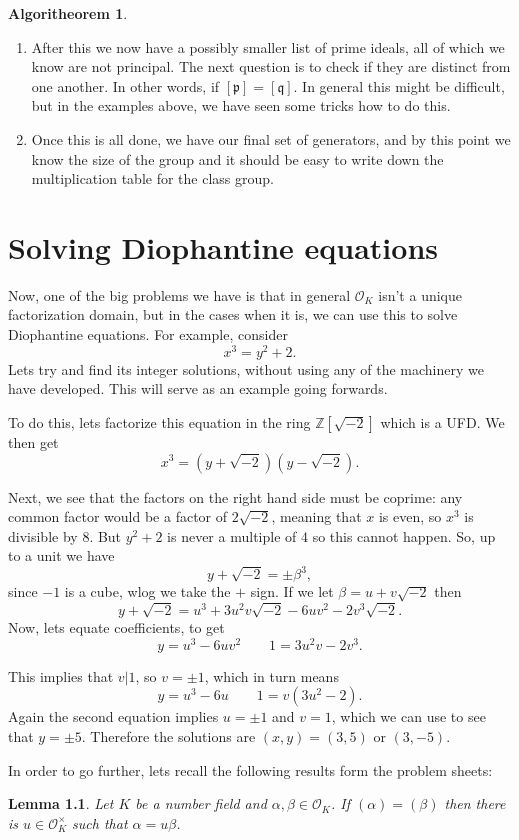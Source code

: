 \documentclass[11pt,a4paper]{report}
\theoremstyle{plain}
\newtheorem{lemma}[subsection]{Lemma}
\theoremstyle{definition}
\theoremstyle{definition}
\newtheorem{alg}[subsection]{Algoritheorem}
\newcommand{\ZZ}{\mathbb{Z}}
\def\gothp{\mathfrak{p}}
\def\gothq{\mathfrak{q}}
\def \a{\alpha}
\def \OO {\mathcal{O}}
\begin{document}
\begin{alg}
\begin{enumerate}
			\item After this we now have a possibly smaller list of prime ideals, all of which we know are not principal. The next question is to check if they are distinct from one another. In other words, if $[\gothp]=[\gothq]$. In general this might be difficult, but in the examples above, we have seen some tricks how to do this.
			
			\item Once this is all done, we have our final set of generators, and by this point we know the size of the group and it should be easy to write down the multiplication table for the class group.
			
		\end{enumerate}
	\end{alg}
	
	
	\chapter{Solving Diophantine equations}
	Now, one of the big problems we have is that in general $\OO_K$ isn't a unique factorization domain, but in the cases when it is, we can use this to solve Diophantine equations. For example, consider \[x^3=y^2+2.\] Lets try and find its integer solutions, without using any of the machinery we have developed. This will serve as an example going forwards.
	
	To do this, lets factorize this equation in the ring $\ZZ[\sqrt{-2}]$ which is a UFD. We then get \[x^3=(y+\sqrt{-2})(y-\sqrt{-2}).\]
	
	Next, we see that the factors on the right hand side must be coprime: any common factor would be a factor of $2\sqrt{-2}$, meaning that $x$ is even, so $x^3$ is divisible by $8$. But $y^2+2$ is never a multiple of $4$ so this cannot happen. So, up to a unit we have \[y+\sqrt{-2}=\pm \beta^3,\] since $-1$ is a cube, wlog we take the $+$ sign. If we let $\beta=u+v\sqrt{-2}$ then \[y+\sqrt{-2}=u^3+3u^2v\sqrt{-2}-6uv^2-2v^3\sqrt{-2}.\] Now, lets equate coefficients, to get \[y=u^3-6uv^2 \qquad 1=3u^2v-2v^3.\]
	
	This implies that $v|1$, so $v=\pm 1$, which in turn means \[y=u^3-6u \qquad 1=v(3u^2-2).\] Again the second equation implies $u=\pm 1$ and $v=1$, which we can use to see that $y=\pm 5$. Therefore the solutions are $(x,y)=(3,5)$ or $(3,-5)$.
	
	In order to go further, lets recall the following results form the problem sheets:
	
	\begin{lemma}\label{lem: princ ideals being eq}
		Let $K$ be a number field and $\a,\beta \in \OO_K$. If $(\a)=(\beta)$ then there is  $u \in \OO_K^\times$ such that $\a=u\beta$.
	\end{lemma}
	
\end{document}
